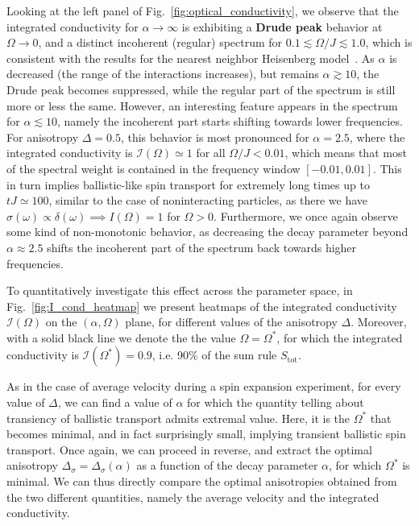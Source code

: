 Looking at the left panel of Fig.~\ref{fig:optical_conductivity}, we observe that the integrated conductivity
for \(\alpha \to \infty\) is exhibiting a \textbf{Drude peak} behavior at \(\Omega \to 0\), and a distinct
incoherent (regular) spectrum for \(0.1 \lesssim \Omega / J \lesssim 1.0\), which is consistent with the results
for the nearest neighbor Heisenberg model~\autocite{Prelovsek2021}. As \(\alpha\) is decreased
(the range of the interactions increases), but remains \(\alpha \gtrsim 10\), the Drude peak
becomes suppressed, while the regular part of the spectrum is still more or less the same.
However, an interesting feature appears in the spectrum for \(\alpha \lesssim 10\), namely
the incoherent part starts shifting towards lower frequencies. For anisotropy \(\Delta = 0.5\),
this behavior is most pronounced for \(\alpha = 2.5\), where the integrated conductivity
is \(\mathcal{I}(\Omega)\simeq 1 \) for all \( \Omega/J < 0.01\), which means that most of the spectral weight
is contained in the frequency window \(\left[-0.01,0.01\right]\). This in turn implies ballistic-like
spin transport for extremely long times up to \(tJ \simeq 100\), similar to the case of noninteracting particles,
as there we have \(\sigma(\omega) \propto \delta(\omega) \implies I(\Omega) = 1\) for \(\Omega > 0\). Furthermore,
we once again observe some kind of non-monotonic behavior, as decreasing the decay parameter
beyond \(\alpha \approx 2.5\) shifts the incoherent part of the spectrum back towards higher frequencies.

To quantitatively investigate this effect across the parameter space, in Fig.~\ref{fig:I_cond_heatmap}
we present heatmaps of the integrated conductivity \(\mathcal{I}(\Omega)\) on the \((\alpha ,\Omega)\) plane,
for different values of the anisotropy \(\Delta\). Moreover, with a solid black line we denote the
the value \(\Omega = \Omega^{\ast}\), for which the integrated conductivity is \(\mathcal{I}(\Omega^{\ast}) = 0.9\),
i.e. 90\% of the sum rule \(S_{\mathrm{tot}}\).


As in the case of average velocity during a spin expansion experiment,
for every value of \(\Delta\), we can find a value of \(\alpha\) for which the quantity telling about transiency
of ballistic transport admits extremal value. Here, it is the \(\Omega^{\ast}\) that becomes minimal,
and in fact surprisingly small, implying transient ballistic spin transport. Once again, we can proceed
in reverse, and extract the optimal anisotropy \(\Delta_{\sigma} = \Delta_{\sigma}(\alpha)\) as a function
of the decay parameter \(\alpha\), for which \(\Omega^{\ast}\) is minimal. We can thus directly compare
the optimal anisotropies obtained from the two different quantities, namely the average velocity and the integrated conductivity.

